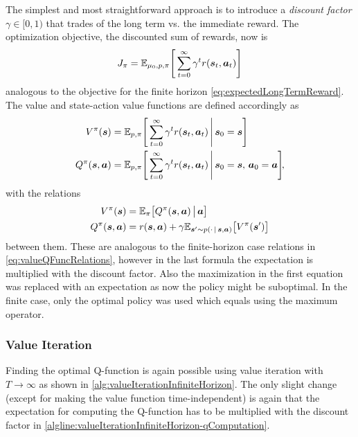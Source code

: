 			The simplest and most straightforward approach is to introduce a \emph{discount factor} \( \gamma \in [0, 1) \) that trades of the long term vs. the immediate reward. The optimization objective, the discounted sum of rewards, now is
			\begin{equation*}
				J_\pi = \mathbb{E}_{\mu_0, p, \pi} \Bigg[ \sum_{t = 0}^{\infty} \gamma^t r(\bm{s}_t, \bm{a}_t) \Bigg]  \label{eq:expectedDiscountedLongTermReward}
			\end{equation*}
			analogous to the objective for the finite horizon \eqref{eq:expectedLongTermReward}. The value and state-action value functions are defined accordingly as
			\begin{align*}
				V^\pi(\bm{s}) &= \mathbb{E}_{p, \pi}\Bigg[ \sum_{t = 0}^{\infty} \gamma^t r(\bm{s}_t, \bm{a}_t) \,\Bigg\vert\, \bm{s}_0 = \bm{s} \Bigg] \\
				Q^\pi(\bm{s}, \bm{a}) &= \mathbb{E}_{p, \pi}\Bigg[ \sum_{t = 0}^{\infty} \gamma^t r(\bm{s}_t, \bm{a}_t) \,\Bigg\vert\, \bm{s}_0 = \bm{s},\, \bm{a}_0 = \bm{a} \Bigg]\!,
			\end{align*}
			with the relations
			\begin{align*}
				V^\pi(\bm{s}) &= \mathbb{E}_\pi\big[ Q^\pi(\bm{s}, \bm{a}) \,\big\vert\, \bm{a} \big] \\
				Q^\pi(\bm{s}, \bm{a}) &= r(\bm{s}, \bm{a}) + \gamma \mathbb{E}_{\bm{s}' \sim p(\cdot \,\vert\, \bm{s}, \bm{a})}\big[ V^\pi(\bm{s}') \big]
			\end{align*}
			between them. These are analogous to the finite-horizon case relations in \eqref{eq:valueQFuncRelations}, however in the last formula the expectation is multiplied with the discount factor. Also the maximization in the first equation was replaced with an expectation as now the policy might be suboptimal. In the finite case, only the optimal policy was used which equals using the maximum operator.

			\subsubsection{Value Iteration}
				Finding the optimal Q-function is again possible using value iteration with \( T \to \infty \) as shown in \autoref{alg:valueIterationInfiniteHorizon}. The only slight change (except for making the value function time-independent) is again that the expectation for computing the Q-function has to be multiplied with the discount factor in \autoref{algline:valueIterationInfiniteHorizon-qComputation}.

